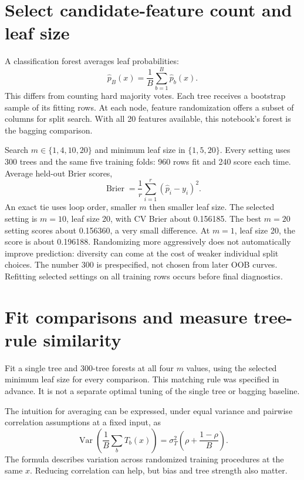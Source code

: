 \section{Select candidate-feature count and leaf size}
A classification forest averages leaf probabilities:
\[\hat p_B(x)=\frac1B\sum_{b=1}^B\hat p_b(x).\]
This differs from counting hard majority votes. Each tree receives a bootstrap sample of its fitting rows. At each node, feature randomization offers a subset of columns for split search. With all 20 features available, this notebook's forest is the bagging comparison.

Search $m\in\{1,4,10,20\}$ and minimum leaf size in $\{1,5,20\}$. Every setting uses 300 trees and the same five training folds: 960 rows fit and 240 score each time. Average held-out Brier scores,
\[\operatorname{Brier}=\frac1r\sum_{i=1}^r(\hat p_i-y_i)^2.\]
An exact tie uses loop order, smaller $m$ then smaller leaf size. The selected setting is $m=10$, leaf size 20, with CV Brier about 0.156185. The best $m=20$ setting scores about 0.156360, a very small difference. At $m=1$, leaf size 20, the score is about 0.196188. Randomizing more aggressively does not automatically improve prediction: diversity can come at the cost of weaker individual split choices.
The number 300 is prespecified, not chosen from later OOB curves. Refitting selected settings on all training rows occurs before final diagnostics.

\section{Fit comparisons and measure tree-rule similarity}
Fit a single tree and 300-tree forests at all four $m$ values, using the selected minimum leaf size for every comparison. This matching rule was specified in advance. It is not a separate optimal tuning of the single tree or bagging baseline.

The intuition for averaging can be expressed, under equal variance and pairwise correlation assumptions at a fixed input, as
\[\operatorname{Var}\!\left(\frac1B\sum_b T_b(x)\right)
=\sigma_T^2\left(\rho+\frac{1-\rho}{B}\right).\]
The formula describes variation across randomized training procedures at the same $x$. Reducing correlation can help, but bias and tree strength also matter.

